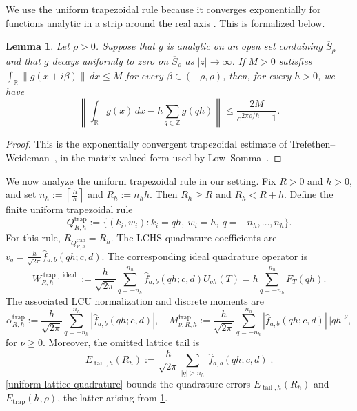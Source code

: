 \documentclass[10pt,reqno]{article}
\numberwithin{equation}{section}
\theoremstyle{plain}
\newtheorem{lem}[thm]{Lemma}
\theoremstyle{definition}
\begin{document}
We use the uniform trapezoidal rule because it converges exponentially for functions analytic in a strip around the real axis \cite{low2025optimallchs}. This is formalized below.

\begin{lem}\label{infinite-line-trapezoidal-estimate}
Let \(\rho>0\). Suppose that \(g\) is analytic on an open set containing \(\overline S_\rho\) and that \(g\) decays uniformly to zero on \(\overline S_\rho\) as \(|z|\to\infty\). If \(M>0\) satisfies $\int_{\mathbb R}\|g(x+i\beta)\|\,dx\le M$
for every \(\beta\in(-\rho,\rho)\), then, for every \(h>0\), we have
\begin{equation}\label{eq:trap-infinite-line}
\left\|\int_{\mathbb R}g(x)\,dx-h\sum_{q\in\mathbb Z}g(qh)\right\|\le \frac{2M}{e^{2\pi \rho/h}-1}.
\end{equation}
\end{lem}

\begin{proof}
This is the exponentially convergent trapezoidal estimate of Trefethen--Weideman~\cite[Theorem~5.1]{trefethen2014exponentially}, in the matrix-valued form used by Low--Somma~\cite[Lemma~10]{low2025optimallchs}.
\end{proof}

We now analyze the uniform trapezoidal rule in our setting. Fix \(R>0\) and \(h>0\), and set $n_h:= \left\lceil\frac{R}{h}\right\rceil$ and $R_h:=n_hh$.  Then \(R_h\ge R\) and \(R_h<R+h\). Define the finite uniform trapezoidal rule
\begin{equation}\label{eq:uniform-trap-Q-def}
Q_{R,h}^{\operatorname{trap}}
:=
\{(k_i,w_i): k_i=qh,\ w_i=h,\ q=-n_h,\ldots,n_h\}.
\end{equation}
For this rule, \(R_{Q_{R,h}^{\operatorname{trap}}}=R_h\). The LCHS quadrature coefficients are \(v_q=\frac{h}{\sqrt{2\pi}}\hat f_{a,b}(qh;c,d)\). The corresponding ideal quadrature operator is
\begin{equation}\label{eq:uniform-lattice-rule}
W_{R,h}^{\operatorname{trap},\operatorname{ideal}} := \frac{h}{\sqrt{2\pi}}\sum_{q=-n_h}^{n_h}\hat f_{a,b}(qh;c,d)U_{qh}(T) = h\sum_{q=-n_h}^{n_h}F_T(qh).
\end{equation}
The associated LCU normalization and discrete moments are
\begin{equation}\label{eq:trap-alpha-def}
\alpha_{R,h}^{\operatorname{trap}} := \frac{h}{\sqrt{2\pi}}\sum_{q=-n_h}^{n_h}|\hat f_{a,b}(qh;c,d)|, \quad M_{\nu,R,h}^{\operatorname{trap}} := \frac{h}{\sqrt{2\pi}}\sum_{q=-n_h}^{n_h}|\hat f_{a,b}(qh;c,d)|\,|qh|^\nu,
\end{equation}
for \(\nu\ge0\). Moreover, the omitted lattice tail is
\begin{equation}\label{eq:lattice-tail}
E_{\operatorname{tail},h}(R_h) := \frac{h}{\sqrt{2\pi}}\sum_{|q|>n_h}|\hat f_{a,b}(qh;c,d)|.
\end{equation}
\cref{uniform-lattice-quadrature} bounds the quadrature errors \(E_{\operatorname{tail},h}(R_h)\) and \(E_{\operatorname{trap}}(h,\rho)\), the latter arising from \cref{infinite-line-trapezoidal-estimate}.
\end{document}

